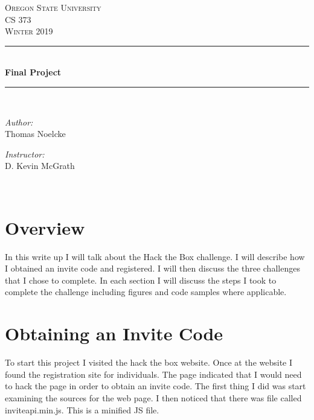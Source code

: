 \documentclass[letterpaper, onecolumn,10pt]{IEEEtran}
\begin{document}
    \begin{titlepage}
    \newcommand{\HRule}{\rule{\linewidth}{0.5mm}}
    \center
    \textsc{\Large Oregon State University}\\[1.5cm]
    \textsc{\Large CS 373}\\[0.5cm]
    \textsc{\Large Winter 2019}\\[0.5cm]
    \HRule \\[0.4cm]
    { \huge \bfseries Final Project}\\[0.4cm] %
    \HRule \\[1.5cm]
    \begin{minipage}{0.4\textwidth}
        \begin{flushleft} \large
        \emph{Author:}\\
        Thomas Noelcke
        \end{flushleft}
    \end{minipage}
    \begin{minipage}{0.4\textwidth}
        \begin{flushright} \large
        \emph{Instructor:} \\
        D. Kevin McGrath\\
        \end{flushright}
    \end{minipage}\\[2cm]
		\end{titlepage}
		
		
		\section{Overview}
		In this write up I will talk about the Hack the Box challenge. I will describe how I obtained an invite code and registered. I will then discuss the three challenges that I chose to complete. In each section I will discuss the steps I took to complete the challenge including figures and code samples where applicable.\\
			
		\section{Obtaining an Invite Code}
		To start this project I visited the hack the box website. Once at the website I found the registration site for individuals. The page indicated that I would need to hack the page in order to obtain an invite code. The first thing I did was start examining the sources for the web page. I then noticed that there was file called inviteapi.min.js. This is a minified JS file.\\
		
\end{document}
